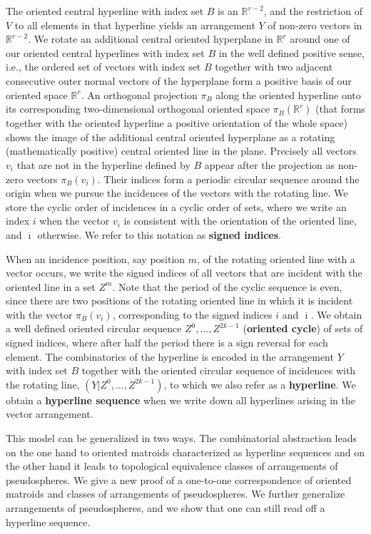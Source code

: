 \documentclass[a4paper]{amsart}
\newcommand{\begriff}[1]{\textbf{#1}}
\theoremstyle{definition}
\theoremstyle{remark}
\begin{document}
The oriented central hyperline with index set $B$ is an $\mathbb
R^{r-2}$, and the restriction of  $V$ to all elements in that hyperline yields an
arrangement $Y$ of non-zero vectors in $\mathbb R^{r-2}$. 
We rotate an additional central oriented hyperplane in $\mathbb R^{r}$ 
around one of our oriented central hyperlines with index set $B$ 
in the well defined positive sense, i.e., the ordered set of vectors with
index set $B$  together with two adjacent consecutive outer normal
vectors of the hyperplane form a positive basis of our oriented space 
$\mathbb R^{r}$. 
An orthogonal projection $\pi_B$ along the oriented hyperline 
onto its corresponding two-dimensional orthogonal oriented space 
$\pi_B(\mathbb R^r)$  
(that forms together with the oriented hyperline a positive orientation 
of the whole space) shows the image of the additional central 
oriented hyperplane as a rotating (mathematically positive) 
central oriented line in the plane.
Precisely all vectors $v_i$ 
that are not in the hyperline defined by $B$ 
appear after the projection as non-zero vectors $\pi_B(v_i).$
Their indices form a periodic circular sequence around the origin
when we pursue the incidences of the vectors with the rotating line.
We store the cyclic order of incidences in a cyclic order of sets,
where we write an index $i$ when the vector $v_i$ is consistent with the
orientation of the oriented line, and $\overline{\imath}$
otherwise. We refer to this notation as \begriff{signed indices}.

When an incidence position, say position $m$, of the rotating 
oriented line with a vector occurs, we write the signed indices of all vectors 
that are incident with the oriented line in a set $Z^m$. Note that the
period of the cyclic sequence is even, since there
are two positions of the rotating oriented line in which it is  incident
with the vector $\pi_B(v_i)$, corresponding to the signed indices $i$ and
$\overline{\imath}$.
%
We obtain a well defined oriented circular sequence $Z^0,\dots,Z^{2k-1}$ 
(\begriff{oriented cycle}) of sets of signed indices, where
after half the period there is a sign reversal for each element.
%
The combinatorics of the hyperline is encoded in the arrangement $Y$ 
with index set $B$ together with the oriented circular sequence of incidences 
with the rotating line,
$(Y|Z^0,\ldots,Z^{2k-1})$,
to which we also refer as a \begriff{hyperline}.
%
We obtain a \begriff {hyperline sequence} when we write
down all hyperlines arising in the vector arrangement.

This model can be generalized in two ways.
The combinatorial abstraction leads on the one hand 
to oriented matroids characterized
as hyperline sequences and on the other hand it leads 
to topological equivalence classes of arrangements of pseudospheres.
We give a new proof of a one-to-one correspondence of oriented matroids
and classes of arrangements of pseudospheres.
We  further generalize arrangements of pseudospheres,
and we show that one can still read off a hyperline sequence.
\end{document}
